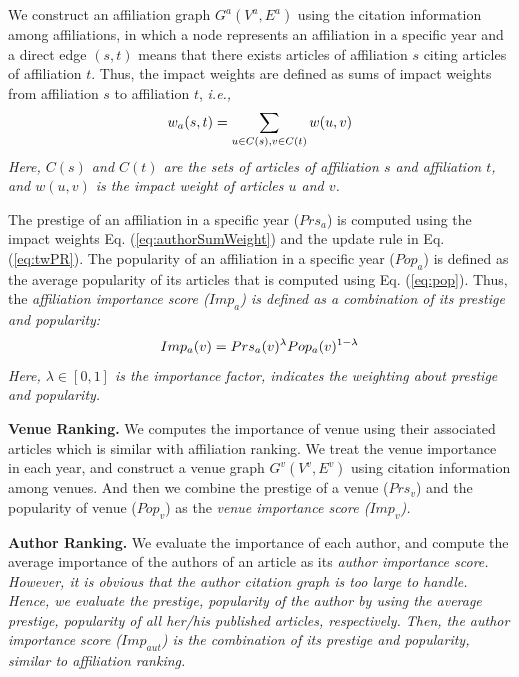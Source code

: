 {\par
We construct an affiliation graph $G^a(V^a, E^a)$ using the citation information among affiliations, in which a node represents an affiliation in a specific year and a direct edge $(s, t)$  means that there exists articles of affiliation $s$ citing articles of affiliation $t$. Thus, the impact weights are defined as sums of impact weights from affiliation $s$ to affiliation $t$, \itshape i.e., \upshape
\begin{equation}
\centering
\label{eq:authorSumWeight}
w_a(s,t) = \sum_{u \in C(s), v \in C(t)} w(u,v)
\end{equation}
Here, $C(s)$ and $C(t)$ are the sets of articles of affiliation $s$ and affiliation $t$, and $w(u,v)$ is the impact weight of articles $u$ and $v$.

\par
The prestige of an affiliation in a specific year ($Prs_a$) is computed using the impact weights Eq. (\ref{eq:authorSumWeight}) and the update rule in Eq. (\ref{eq:twPR}). The popularity of an affiliation in a specific year ($Pop_a$) is defined as the average popularity of its articles that is computed using Eq. (\ref{eq:pop}). Thus, the \itshape affiliation importance score \upshape ($Imp_a$) is defined as a combination of its prestige and popularity:
\begin{equation}
\centering
\label{eq:imp}
Imp_a(v) = Prs_a(v)^{\lambda} Pop_a(v)^{1-\lambda}
\end{equation}
Here, $\lambda \in [0, 1]$ is the importance factor, indicates the weighting about prestige and popularity.

\textbf{Venue Ranking.}
We computes the importance of venue using their associated articles which is similar with affiliation ranking. We treat the venue importance in each year, and construct a venue graph $G^v(V^v, E^v)$ using citation information among venues. And then we combine the prestige of a venue ($Prs_v$) and the popularity of venue ($Pop_v$) as the \itshape venue importance score \upshape ($Imp_v$).


\textbf{Author Ranking.}
We evaluate the importance of each author, and compute the average importance of the authors of an article as its \itshape author importance score. \upshape However, it is obvious that the author citation graph is too large to handle. Hence, we evaluate the prestige, popularity of the author by using the average prestige, popularity of all her/his published articles, respectively. Then, the author importance score ($Imp_{aut}$) is the combination of its prestige and popularity, similar to affiliation ranking.


}
